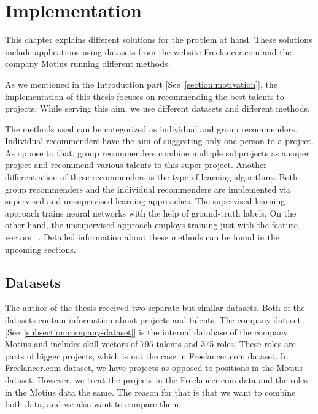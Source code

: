 
\chapter{Implementation}\label{chapter:implementation}

This chapter explains different solutions for the problem at hand. These solutions include applications using datasets from the website Freelancer.com and the company Motius running different methods.

As we mentioned in the Introduction part [See~\autoref{section:motivation}], the implementation of this thesis focuses on recommending the best talents to projects. While serving this aim, we use different datasets and different methods. 


The methods used can be categorized as individual and group recommenders. Individual recommenders have the aim of suggesting only one person to a project. As oppose to that, group recommenders combine multiple subprojects as a super project and recommend various talents to this super project. Another differentiation of these recommenders is the type of learning algorithms. Both group recommenders and the individual recommenders are implemented via supervised and unsupervised learning approaches. The supervised learning approach trains neural networks with the help of ground-truth labels. On the other hand, the unsupervised approach employs training just with the feature vectors ~\parencite{sathya2013comparison}. Detailed information about these methods can be found in the upcoming sections. 

\section{Datasets}\label{section:datasets}

The author of the thesis received two separate but similar datasets. Both of the datasets contain information about projects and talents. The company dataset [See~\autoref{subsection:company-dataset}] is the internal database of the company Motius and includes skill vectors of 795 talents and 375 roles. These roles are parts of bigger projects, which is not the case in Freelancer.com dataset. In Freelancer.com dataset, we have projects as opposed to positions in the Motius dataset. However, we treat the projects in the Freelancer.com data and the roles in the Motius data the same. The reason for that is that we want to combine both data, and we also want to compare them.



